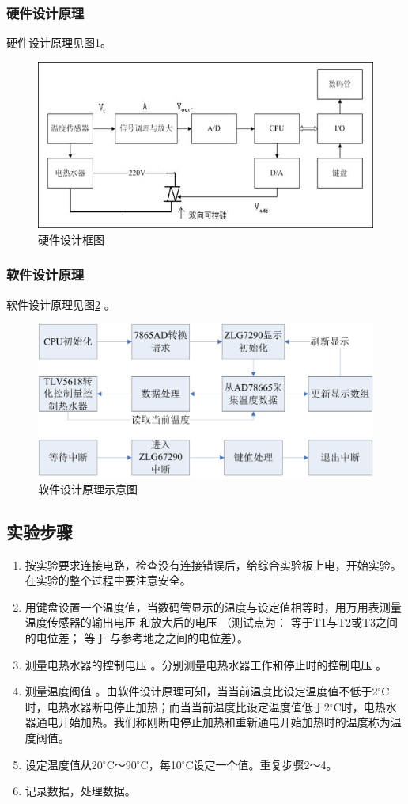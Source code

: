 \documentclass[12pt]{article}
\begin{document}
\subsubsection{硬件设计原理}
硬件设计原理见图\ref{yjsjkt}。
\begin{figure}[htbp]
  \centering
  \includegraphics[width=.7\textwidth]{image004}
  \caption{硬件设计框图}\label{yjsjkt}
\end{figure}
\subsubsection{软件设计原理}
软件设计原理见图\ref{yjsjkt2}
。
\begin{figure}[htbp]
  \centering
  \includegraphics[width=.7\textwidth]{PPT1}
  \caption{软件设计原理示意图}\label{yjsjkt2}
\end{figure}
\subsection{实验步骤}
\begin{enumerate}
  \item 按实验要求连接电路，检查没有连接错误后，给综合实验板上电，开始实验。在实验的整个过程中要注意安全。
\item 用键盘设置一个温度值，当数码管显示的温度与设定值相等时，用万用表测量温度传感器的输出电压 和放大后的电压 （测试点为： 等于T1与T2或T3之间的电位差； 等于 与参考地之之间的电位差）。
\item 测量电热水器的控制电压 。分别测量电热水器工作和停止时的控制电压 。
\item 测量温度阀值 。由软件设计原理可知，当当前温度比设定温度值不低于2$^{\circ}$C时，电热水器断电停止加热；而当当前温度比设定温度值低于2$^{\circ}$C时，电热水器通电开始加热。我们称刚断电停止加热和重新通电开始加热时的温度称为温度阀值。
\item 设定温度值从20$^{\circ}$C～90$^{\circ}$C，每10$^{\circ}$C设定一个值。重复步骤2～4。
\item 记录数据，处理数据。
\end{enumerate}
\end{document}
